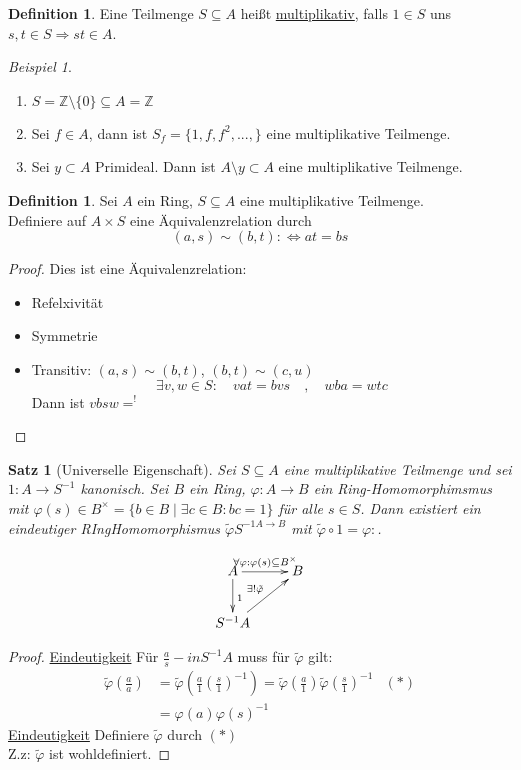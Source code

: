 \documentclass[10pt,a4paper]{article}
\newcommand{\Z}{\ensuremath{\mathbb{Z}}}
\newcounter{thm}[section]
\theoremstyle{definition}
\newtheorem{definition}[thm]{Definition}
\theoremstyle{plain}
\newtheorem{satz}[thm]{Satz}
\theoremstyle{remark}
\newtheorem{exm}[thm]{Beispiel}
\begin{document}
\begin{definition}
	Eine Teilmenge $S\subseteq A$ heißt \underline{multiplikativ}, falls $1\in S$ uns $s,t\in S\Rightarrow st\in A$.
\end{definition}
\begin{exm}
	\begin{enumerate}
		\item $S=\Z\setminus \{0\}\subseteq A=\Z$
		\item Sei $f\in A$, dann ist $S_f=\{1,f,f^2,...,\}$ eine multiplikative Teilmenge.
		\item Sei $y\subset A$ Primideal. Dann ist $A\setminus y\subset A$ eine multiplikative Teilmenge.
	\end{enumerate}
\end{exm}
\begin{definition}
	Sei $A$ ein Ring, $S\subseteq A$ eine multiplikative Teilmenge.\\
	Definiere auf $A\times S$ eine Äquivalenzrelation durch
	\[(a,s)\sim (b,t):\Leftrightarrow at=bs\]
\end{definition}
\begin{proof}
	Dies ist eine Äquivalenzrelation:\begin{itemize}
		\item Refelxivität
		\item Symmetrie
		\item Transitiv: $(a,s)\sim (b,t)$, $(b,t)\sim (c,u)$
		\[\exists v,w\in S:\quad vat=bvs\quad,\quad wba=wtc\]
		Dann ist $vbsw=^!$ %
	\end{itemize}
\end{proof}
\begin{satz}[Universelle Eigenschaft]
	Sei $S\subseteq A$ eine multiplikative Teilmenge und sei $1:A\rightarrow S^{-1}$ kanonisch. Sei $B$ ein Ring, $\varphi:A\rightarrow B$ ein Ring-Homomorphimsmus mit $\varphi(s)\in B^\times=\{b\in B\mid  \exists c\in B: bc=1\}$ für alle $s\in S$. Dann existiert ein eindeutiger RIngHomomorphismus $\tilde{\varphi}S^{-1 A\rightarrow B}$ mit $\tilde{\varphi}\circ 1=\varphi:$.
	
	\[\xymatrix{
		 A\ar[r]^{\forall\varphi:\varphi(s)\subseteq B^\times}\ar[d]^{1}&B\\
		S^{-1}A\ar[ru]^{\exists!\tilde\varphi}&
	}\]
\end{satz}
\begin{proof}
	\underline{Eindeutigkeit} Für $\frac{a}{s}-in S^{-1}A$ muss für $\tilde{\varphi}$ gilt:
	\begin{align*}
	\tilde\varphi\left(\frac{a}{a}\right)&=\tilde{\varphi}\left(\frac{a}{1}\left(\frac{s}{1}\right)^{-1}\right)=\tilde{\varphi}\left(\frac{a}{1}\right)\tilde{\varphi}\left(\frac{s}{1}\right)^{-1}&(*)\\
	&=\varphi(a)\varphi(s)^{-1}
	\end{align*}
	\underline{Eindeutigkeit}
	Definiere $\tilde\varphi$ durch $(*)$\\
	Z.z: $\tilde\varphi$ ist wohldefiniert.
\end{proof}
\end{document}

